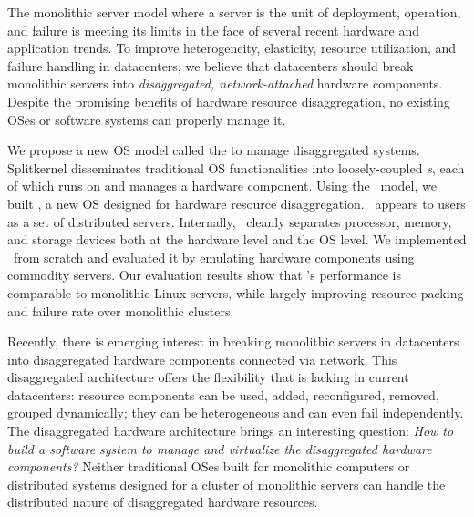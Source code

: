 \documentclass[10pt,times,twocolumn]{z2-article}
\begin{document}
The monolithic server model where a server is the unit of deployment, operation, and failure 
is meeting its limits in the face of several recent hardware and application trends. 
To improve heterogeneity, elasticity, resource utilization, and failure handling in datacenters, 
we believe that datacenters should break monolithic servers into {\em disaggregated, network-attached} hardware components. 
Despite the promising benefits of hardware resource disaggregation, 
no existing OSes or software systems can properly manage it.

We propose a new OS model called the {\em \splitkernel} to manage disaggregated systems. 
Splitkernel disseminates traditional OS functionalities into loosely-coupled {\em \microos{}s},
each of which runs on and manages a hardware component.
Using the \splitkernel\ model, we built {\em \lego}, 
a new OS designed for hardware resource disaggregation. 
\lego\ appears to users as a set of distributed servers.
Internally, \lego\ cleanly separates processor, memory, and storage devices 
both at the hardware level and the OS level.
We implemented \lego\ from scratch and evaluated it by emulating hardware components using commodity servers. 
Our evaluation results show that \lego's performance is comparable to monolithic Linux servers,
while largely improving resource packing and failure rate over monolithic clusters.




Recently, there is emerging interest in breaking monolithic servers in datacenters into disaggregated hardware components connected via network.
This disaggregated architecture offers the flexibility that is lacking in current datacenters:
resource components can be used, added, reconfigured, removed, grouped dynamically;
they can be heterogeneous and can even fail independently.
The disaggregated hardware architecture brings an interesting question:
{\em How to build a software system to manage and virtualize the disaggregated hardware components?}
Neither traditional OSes built for monolithic computers or distributed systems designed for a cluster of monolithic servers 
can handle the distributed nature of disaggregated hardware resources. 
\end{document}
